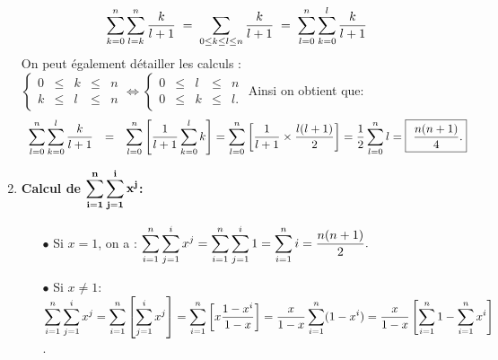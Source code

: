 \documentclass[a4paper, 11pt,reqno]{article}
\begin{document}
\begin{correction}
\begin{enumerate}
$$\displaystyle \sum\limits_{k=0}^n\displaystyle \sum\limits_{l=k}^n \displaystyle\frac{k}{l+1} \; = \; \sum_{0\leq k \leq l \leq n} \displaystyle\frac{k}{l+1}  \; = \;  \displaystyle \sum\limits_{l=0}^n\displaystyle \sum\limits_{k=0}^l \displaystyle\frac{k}{l+1}$$
On peut \'egalement d\'etailler les calculs : $\left\lbrace \begin{array}{lllll}
0 & \leq & k & \leq & n\\
k & \leq & l & \leq & n
\end{array}\right.
\Longleftrightarrow
\left\lbrace \begin{array}{lllll}
0 & \leq &l & \leq & n\\
0 & \leq & k & \leq & l.
\end{array}\right.
$
Ainsi on obtient que: $$\begin{array}{lll}
\displaystyle \sum\limits_{l=0}^n\displaystyle \sum\limits_{k=0}^l \displaystyle\frac{k}{l+1}&=& \displaystyle \sum\limits_{l=0}^n\left\lbrack \displaystyle\frac{1}{l+1}
 \displaystyle \sum\limits_{k=0}^l k\right\rbrack
=  \displaystyle \sum\limits_{l=0}^n\left\lbrack   \displaystyle\frac{1}{l+1}  \times \displaystyle\frac{l(l+1)}{2} \right\rbrack
=\displaystyle\frac{1}{2}  \displaystyle \sum\limits_{l=0}^n l=\fbox{ $\displaystyle\frac{n(n+1)}{4}$.}
\end{array}$$
\item  \textbf{Calcul de $\mathbf{\displaystyle \sum\limits_{i=1}^n\displaystyle \sum\limits_{j=1}^i x^j}$:} 
\begin{itemize}
\item[$\bullet$] Si $x=1$, on a : $\displaystyle \sum\limits_{i=1}^n\displaystyle \sum\limits_{j=1}^i x^j = \displaystyle \sum\limits_{i=1}^n\displaystyle \sum\limits_{j=1}^i 1 = \displaystyle \sum\limits_{i=1}^n i = \frac{n(n+1)}{2}.$ 
\item[$\bullet$] Si $x\not= 1$:
\noindent  $\displaystyle \sum\limits_{i=1}^n\displaystyle \sum\limits_{j=1}^i x^j=\displaystyle \sum\limits_{i=1}^n\left\lbrack \displaystyle \sum\limits_{j=1}^i x^j \right\rbrack=\displaystyle \sum\limits_{i=1}^n\left\lbrack x\displaystyle\frac{1-x^{i}  }{1-x} \right\rbrack
= \displaystyle\frac{x}{1-x}  \displaystyle \sum\limits_{i=1}^n (1-x^{i}) =\displaystyle\frac{x}{1-x}  \left\lbrack \displaystyle \sum\limits_{i=1}^n  1 -  \displaystyle \sum\limits_{i=1}^n  x^i   \right\rbrack$. \\

\end{itemize}
\end{enumerate}
\end{correction}
\end{document}
